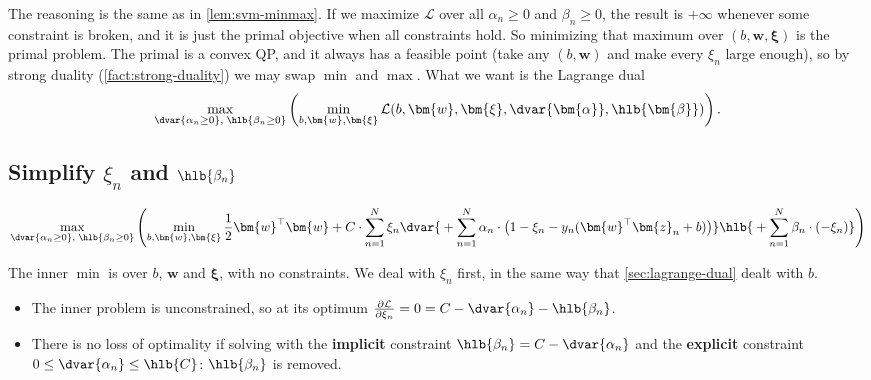 The reasoning is the same as in \autoref{lem:svm-minmax}. If we maximize
\(\mathcal{L}\) over all \(\alpha_n \ge 0\) and \(\beta_n \ge 0\), the
result is \(+\infty\) whenever some constraint is broken, and it is just the
primal objective when all constraints hold. So minimizing that maximum over
\((b, \bm{w}, \bm{\xi})\) is the primal problem. The primal is a convex QP,
and it always has a feasible point (take any \((b, \bm{w})\) and make every
\(\xi_n\) large enough), so by strong duality (\autoref{fact:strong-duality})
we may swap \(\min\) and \(\max\). What we want is the Lagrange dual
\[
    \max_{\dvar{\alpha_n \ge 0}, \; \hlb{\beta_n \ge 0}} \left( \min_{b,
    \bm{w}, \bm{\xi}} \mathcal{L}(b, \bm{w}, \bm{\xi}, \dvar{\bm{\alpha}},
    \hlb{\bm{\beta}}) \right).
\]

\subsection{Simplify \texorpdfstring{\(\xi_n\)}{xi} and \texorpdfstring{\(\hlb{\beta_n}\)}{beta}}

\[
    \max_{\dvar{\alpha_n \ge 0}, \; \hlb{\beta_n \ge 0}} \left( \min_{b,
    \bm{w}, \bm{\xi}} \frac{1}{2} \bm{w}^\top \bm{w} + C \cdot \sum_{n=1}^N
    \xi_n \dvar{{} + \sum_{n=1}^N \alpha_n \cdot \bigl( 1 - \xi_n - y_n
    (\bm{w}^\top \bm{z}_n + b) \bigr)} \hlb{{} + \sum_{n=1}^N \beta_n \cdot
    (-\xi_n)} \right)
\]

The inner \(\min\) is over \(b\), \(\bm{w}\) and \(\bm{\xi}\), with no
constraints. We deal with \(\xi_n\) first, in the same way that
\autoref{sec:lagrange-dual} dealt with \(b\).
\begin{itemize}
    \item The inner problem is unconstrained, so at its optimum
        \(\frac{\partial \mathcal{L}}{\partial \xi_n} = 0 = C -
        \dvar{\alpha_n} - \hlb{\beta_n}\).
    \item There is no loss of optimality if solving with the
        \textbf{implicit} constraint \(\hlb{\beta_n} = C - \dvar{\alpha_n}\)
        and the \textbf{explicit} constraint \(0 \le \dvar{\alpha_n} \le
        \hlb{C}\): \(\hlb{\beta_n}\) is removed.
\end{itemize}

